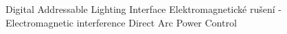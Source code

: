 


  {Digital Addressable Lighting Interface}
  {Elektromagnetické rušení - Electromagnetic interference}
 {Direct Arc Power Control}


